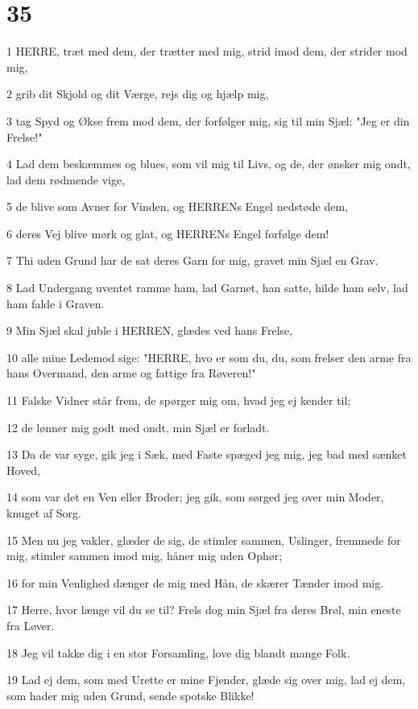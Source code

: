 \chapter{35}

\par 1 HERRE, træt med dem, der trætter med mig, strid imod dem, der strider mod mig,
\par 2 grib dit Skjold og dit Værge, rejs dig og hjælp mig,
\par 3 tag Spyd og Økse frem mod dem, der forfølger mig, sig til min Sjæl: "Jeg er din Frelse!"
\par 4 Lad dem beskæmmes og blues, som vil mig til Livs, og de, der ønsker mig ondt, lad dem rødmende vige,
\par 5 de blive som Avner for Vinden, og HERRENs Engel nedstøde dem,
\par 6 deres Vej blive mørk og glat, og HERRENs Engel forfølge dem!
\par 7 Thi uden Grund har de sat deres Garn for mig, gravet min Sjæl en Grav.
\par 8 Lad Undergang uventet ramme ham, lad Garnet, han satte, hilde ham selv, lad ham falde i Graven.
\par 9 Min Sjæl skal juble i HERREN, glædes ved hans Frelse,
\par 10 alle mine Ledemod sige: "HERRE, hvo er som du, du, som frelser den arme fra hans Overmand, den arme og fattige fra Røveren!"
\par 11 Falske Vidner står frem, de spørger mig om, hvad jeg ej kender til;
\par 12 de lønner mig godt med ondt, min Sjæl er forladt.
\par 13 Da de var syge, gik jeg i Sæk, med Faste spæged jeg mig, jeg bad med sænket Hoved,
\par 14 som var det en Ven eller Broder; jeg gik, som sørged jeg over min Moder, knuget af Sorg.
\par 15 Men nu jeg vakler, glæder de sig, de stimler sammen, Uslinger, fremmede for mig, stimler sammen imod mig, håner mig uden Ophør;
\par 16 for min Venlighed dænger de mig med Hån, de skærer Tænder imod mig.
\par 17 Herre, hvor længe vil du se til? Frels dog min Sjæl fra deres Brøl, min eneste fra Løver.
\par 18 Jeg vil takke dig i en stor Forsamling, love dig blandt mange Folk.
\par 19 Lad ej dem, som med Urette er mine Fjender, glæde sig over mig, lad ej dem, som hader mig uden Grund, sende spotske Blikke!
